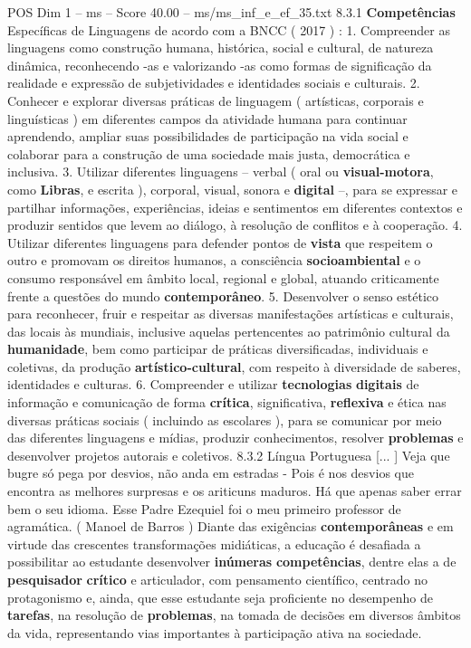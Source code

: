 \begin{textsample}{POS Dim 1 – ms – Score 40.00 – ms/ms\_inf\_e\_ef\_35.txt}  \label{ex:f1_pos_190}
8.3.1 \textbf{Competências} Específicas de Linguagens de acordo com a BNCC ( 2017 ) : 1.
Compreender as linguagens como construção humana, histórica, social e cultural, de natureza dinâmica, reconhecendo -as e valorizando -as como formas de significação da realidade e expressão de subjetividades e identidades sociais e culturais. 2.
Conhecer e explorar diversas práticas de linguagem ( artísticas, corporais e linguísticas ) em diferentes campos da atividade humana para continuar aprendendo, ampliar suas possibilidades de participação na vida social e colaborar para a construção de uma sociedade mais justa, democrática e inclusiva. 3.
Utilizar diferentes linguagens – verbal ( oral ou \textbf{visual-motora}, como \textbf{Libras}, e escrita ), corporal, visual, sonora e \textbf{digital} –, para se expressar e partilhar informações, experiências, ideias e sentimentos em diferentes contextos e produzir sentidos que levem ao diálogo, à resolução de conflitos e à cooperação. 4.
Utilizar diferentes linguagens para defender pontos de \textbf{vista} que respeitem o outro e promovam os direitos humanos, a consciência \textbf{socioambiental} e o consumo responsável em âmbito local, regional e global, atuando criticamente frente a questões do mundo \textbf{contemporâneo}. 5.
Desenvolver o senso estético para reconhecer, fruir e respeitar as diversas manifestações artísticas e culturais, das locais às mundiais, inclusive aquelas pertencentes ao patrimônio cultural da \textbf{humanidade}, bem como participar de práticas diversificadas, individuais e coletivas, da produção \textbf{artístico-cultural}, com respeito à diversidade de saberes, identidades e culturas. 6.
Compreender e utilizar \textbf{tecnologias} \textbf{digitais} de informação e comunicação de forma \textbf{crítica}, significativa, \textbf{reflexiva} e ética nas diversas práticas sociais ( incluindo as escolares ), para se comunicar por meio das diferentes linguagens e mídias, produzir conhecimentos, resolver \textbf{problemas} e desenvolver projetos autorais e coletivos. 8.3.2 Língua Portuguesa [... ] Veja que bugre só pega por desvios, não anda em estradas - Pois é nos desvios que encontra as melhores surpresas e os ariticuns maduros.
Há que apenas saber errar bem o seu idioma.
Esse Padre Ezequiel foi o meu primeiro professor de agramática. ( Manoel de Barros ) Diante das exigências \textbf{contemporâneas} e em virtude das crescentes transformações midiáticas, a educação é desafiada a possibilitar ao estudante desenvolver \textbf{inúmeras} \textbf{competências}, dentre elas a de \textbf{pesquisador} \textbf{crítico} e articulador, com pensamento científico, centrado no protagonismo e, ainda, que esse estudante seja proficiente no desempenho de \textbf{tarefas}, na resolução de \textbf{problemas}, na tomada de decisões em diversos âmbitos da vida, representando vias importantes à participação ativa na sociedade.

\end{textsample}
